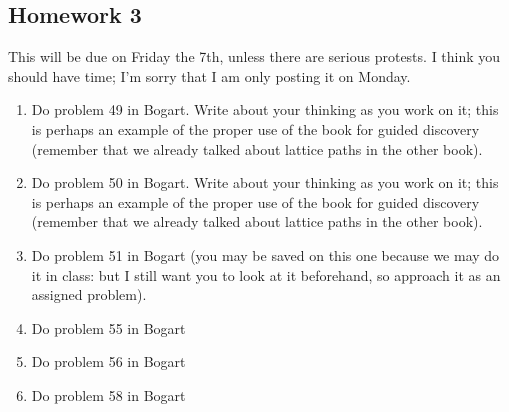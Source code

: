 \documentclass[12pt]{article}
\begin{document}
\begin{description}
\begin{description}
\section{Homework 3}

This will be due on Friday the 7th, unless there are serious protests.  I think you should have time;  I'm sorry that I am only posting it on Monday.

\begin{enumerate}

\item Do problem 49 in Bogart.  Write about your thinking as you work on it;  this is perhaps an example of the proper use of the book for guided discovery (remember that we already talked about lattice paths in the other book).


\item Do problem 50 in Bogart.  Write about your thinking as you work on it;  this is perhaps an example of the proper use of the book for guided discovery (remember that we already talked about lattice paths in the other book).


\item Do problem 51 in Bogart (you may be saved on this one because we may do it in class:  but I still want you to look at it beforehand, so approach it as an assigned problem).

\item Do problem 55 in Bogart


\item Do problem 56 in Bogart

\item Do problem 58 in Bogart


\end{enumerate}








\end{description}



\end{description}
\end{document}
